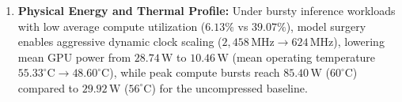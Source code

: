\begin{enumerate}
    \item \textbf{Physical Energy and Thermal Profile:} Under bursty inference workloads with low average compute utilization ($6.13\%$ vs $39.07\%$), model surgery enables aggressive dynamic clock scaling ($2{,}458\,\text{MHz} \to 624\,\text{MHz}$), lowering mean GPU power from $28.74\,\text{W}$ to $10.46\,\text{W}$ (mean operating temperature $55.33^\circ\text{C} \to 48.60^\circ\text{C}$), while peak compute bursts reach $85.40\,\text{W}$ ($60^\circ\text{C}$) compared to $29.92\,\text{W}$ ($56^\circ\text{C}$) for the uncompressed baseline.
\end{enumerate}
